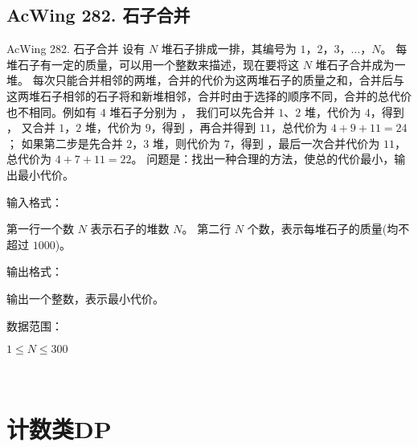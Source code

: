\subsection{AcWing 282. 石子合并}
\begin{titledbox}{AcWing 282. 石子合并}
    设有 $N$ 堆石子排成一排，其编号为 $1，2，3，\dots，N$。 每堆石子有一定的质量，可以用一个整数来描述，现在要将这 $N$ 堆石子合并成为一堆。 每次只能合并相邻的两堆，合并的代价为这两堆石子的质量之和，合并后与这两堆石子相邻的石子将和新堆相邻，合并时由于选择的顺序不同，合并的总代价也不相同。例如有 $4$ 堆石子分别为 ， 我们可以先合并 $1、2$ 堆，代价为 $4$，得到 ， 又合并 $1，2$ 堆，代价为 $9$，得到  ，再合并得到 $11$，总代价为 $4+9+11=24$； 如果第二步是先合并 $2，3$ 堆，则代价为 $7$，得到 ，最后一次合并代价为 $11$，总代价为 $4+7+11=22$。 问题是：找出一种合理的方法，使总的代价最小，输出最小代价。

    输入格式：

    第一行一个数 $N$ 表示石子的堆数 $N$。 第二行 $N$ 个数，表示每堆石子的质量(均不超过 $1000$)。

    输出格式：

    输出一个整数，表示最小代价。

    数据范围：

    $1 \le N \le 300$

    \begin{inputblock}
         \\
    \end{inputblock}
    \begin{outputblock}
    \end{outputblock}
\end{titledbox}


\section{计数类DP}

